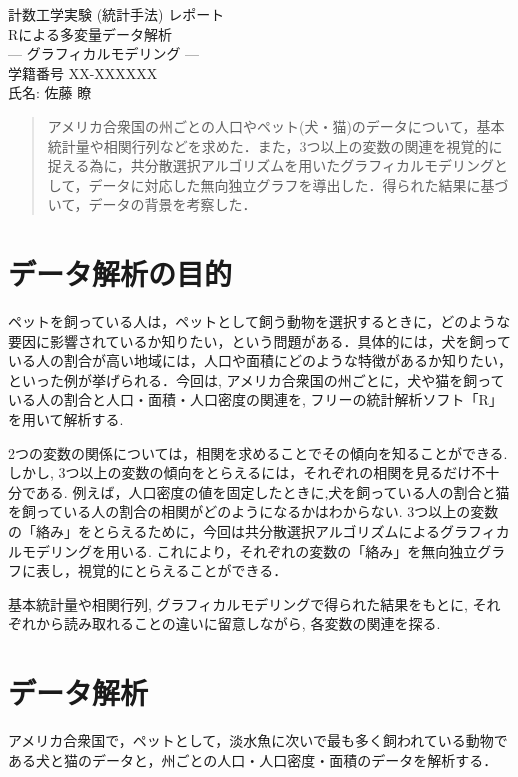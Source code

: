 \documentclass[11pt,dvipdfmx]{jarticle}
\theoremstyle{definition}
\begin{document}
\begin{center}
\vspace*{6mm}
{\Large 計数工学実験 (統計手法) レポート\\ \vspace*{2mm} Rによる多変量データ解析\\ \vspace*{2mm} --- グラフィカルモデリング ---}\\
\vspace*{4mm}
学籍番号 XX-XXXXXX\\
氏名: 佐藤 瞭
\end{center}

\begin{abstract}
アメリカ合衆国の州ごとの人口やペット(犬・猫)のデータについて，基本統計量や相関行列などを求めた．また，3つ以上の変数の関連を視覚的に捉える為に，共分散選択アルゴリズムを用いたグラフィカルモデリングとして，データに対応した無向独立グラフを導出した．得られた結果に基づいて，データの背景を考察した．
\end{abstract}


\section{データ解析の目的} \label{section:mokuteki}
ペットを飼っている人は，ペットとして飼う動物を選択するときに，どのような要因に影響されているか知りたい，という問題がある．具体的には，犬を飼っている人の割合が高い地域には，人口や面積にどのような特徴があるか知りたい，といった例が挙げられる．今回は, アメリカ合衆国の州ごとに，犬や猫を飼っている人の割合と人口・面積・人口密度の関連を, フリーの統計解析ソフト「R」を用いて解析する.  

2つの変数の関係については，相関を求めることでその傾向を知ることができる. しかし, 3つ以上の変数の傾向をとらえるには，それぞれの相関を見るだけ不十分である. 例えば，人口密度の値を固定したときに,犬を飼っている人の割合と猫を飼っている人の割合の相関がどのようになるかはわからない. 3つ以上の変数の「絡み」をとらえるために，今回は共分散選択アルゴリズムによるグラフィカルモデリングを用いる. これにより，それぞれの変数の「絡み」を無向独立グラフに表し，視覚的にとらえることができる．

基本統計量や相関行列, グラフィカルモデリングで得られた結果をもとに, それぞれから読み取れることの違いに留意しながら, 各変数の関連を探る. 


\section{データ解析} \label{section:gaiyou}
アメリカ合衆国で，ペットとして，淡水魚に次いで最も多く飼われている\cite{number_of_pets}動物である犬と猫のデータと，州ごとの人口・人口密度・面積のデータを解析する．
\end{document}
